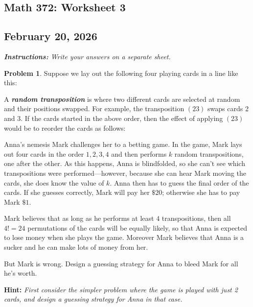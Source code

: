 \documentclass[10pt]{article}
\theoremstyle{definition}
\newtheorem{problem}[theorem]{Problem}
\newcommand{\fl}{\noindent\textbf} %
\newcommand{\1}[1]{\textbf{1}_{\left[#1\right]}} %
\newcommand{\dempfcolor}[1]{{\color{RoyalBlue}#1}}
\newcommand{\demph}[1]{\dempfcolor{\textit{\textbf{#1}}}}
\begin{document}
\begin{center}
  \section*{Math 372: Worksheet 3}
  \subsection*{February 20, 2026}
\end{center}
\textit{\textbf{Instructions:} Write your answers on a separate sheet.}

\begin{problem}
  Suppose we lay out the following four playing cards in a line like this:
  \begin{center}
    \crdAs \crdtwos \crdtres \crdfours
  \end{center}
  A \demph{random transposition} is where two different cards are selected at random and
  their positions swapped. For example, the transposition $(23)$ swaps cards 2
  and 3. If the cards started in the above order, then the effect of applying
  $(23)$ would be to reorder the cards as follows:
  \begin{center}
    \crdAs \crdtres \crdtwos \crdfours
  \end{center}

  
  Anna's nemesis Mark challenges her to a betting game. In the game, Mark lays
  out four cards in the order $1,2,3,4$ and then performs $k$ random
  transpositions, one after the other. As this happens, Anna is blindfolded,
  so she can't see which transpositions were performed---however, because she
  can hear Mark moving the cards, she does know the value of $k$. Anna then
  has to guess the final order of the cards. If she guesses correctly, Mark
  will pay her $\$20$; otherwise she has to pay Mark $\$1$.

  Mark believes that as long as he performs at least $4$ transpositions, then
  all $4!=24$ permutations of the cards will be equally likely, so that Anna
  is expected to lose money when she plays the game. Moreover Mark believes
  that Anna is a sucker and he can make lots of money from her.

  But Mark is wrong. Design a guessing strategy for Anna to bleed Mark for all
  he's worth.

  \fl{Hint:} \textit{First consider the simpler problem where the game is
    played with just 2 cards, and design a guessing strategy for Anna in that
    case.}


\end{problem}
\end{document}
